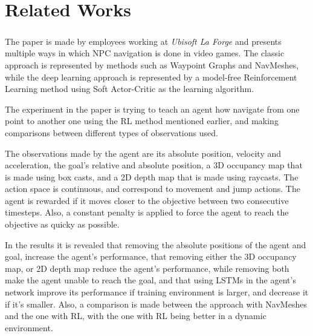 \chapter{Related Works}

\paragraph{}
The paper \cite{alonso2020deeplearningnavigation} is made by employees working at \emph{Ubisoft La Forge} and presents multiple ways in which NPC navigation is done in video games. The classic approach is represented by methods such as Waypoint Graphs and NavMeshes, while the deep learning approach is represented by a model-free Reinforcement Learning method using Soft Actor-Critic as the learning algorithm. 

The experiment in the paper is trying to teach an agent how navigate from one point to another one using the RL method mentioned earlier, and making comparisons between different types of observations used.

The observations made by the agent are its absolute position, velocity and acceleration, the goal's relative and absolute position, a 3D occupancy map that is made using box casts, and a 2D depth map that is made using raycasts. The action space is continuous, and correspond to movement and jump actions. The agent is rewarded if it moves closer to the objective between two consecutive timesteps. Also, a constant penalty is applied to force the agent to reach the objective as quicky as possible.

In the results it is revealed that removing the absolute positions of the agent and goal, increase the agent's performance, that removing either the 3D occupancy map, or 2D depth map reduce the agent's performance, while removing both make the agent unable to reach the goal, and that using LSTMs in the agent's network improve its performance if training environment is larger, and decrease it if it's smaller. Also, a comparison is made between the approach with NavMeshes and the one with RL, with the one with RL being better in a dynamic environment.



